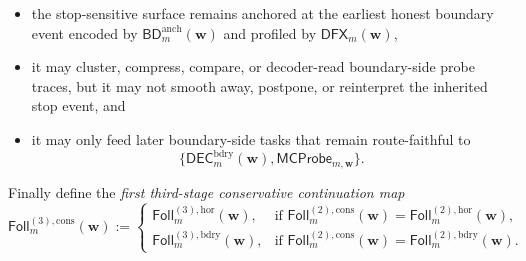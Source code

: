 \begin{definition}
\begin{enumerate}[label=(\roman*)]
  \begin{itemize}[leftmargin=2em]
    \item the stop-sensitive surface remains anchored at the earliest honest boundary event encoded by \(\mathsf{BD}^{\mathrm{anch}}_{m}(\mathbf w)\) and profiled by \(\mathsf{DFX}_{m}(\mathbf w)\),
    \item it may cluster, compress, compare, or decoder-read boundary-side probe traces, but it may not smooth away, postpone, or reinterpret the inherited stop event, and
    \item it may only feed later boundary-side tasks that remain route-faithful to
    \[
      \{\mathsf{DEC}^{\mathrm{bdry}}_{m}(\mathbf w),\mathsf{MCProbe}_{m,\mathbf w}\}.
    \]
  \end{itemize}
\end{enumerate}
Finally define the \emph{first third-stage conservative continuation map}
\[
  \mathsf{Foll}^{(3),\mathrm{cons}}_{m}(\mathbf w)
  :=
  \begin{cases}
    \mathsf{Foll}^{(3),\mathrm{hor}}_{m}(\mathbf w), & \text{if }\mathsf{Foll}^{(2),\mathrm{cons}}_{m}(\mathbf w)=\mathsf{Foll}^{(2),\mathrm{hor}}_{m}(\mathbf w),\\[2mm]
    \mathsf{Foll}^{(3),\mathrm{bdry}}_{m}(\mathbf w), & \text{if }\mathsf{Foll}^{(2),\mathrm{cons}}_{m}(\mathbf w)=\mathsf{Foll}^{(2),\mathrm{bdry}}_{m}(\mathbf w).
  \end{cases}
\]
\end{definition}

